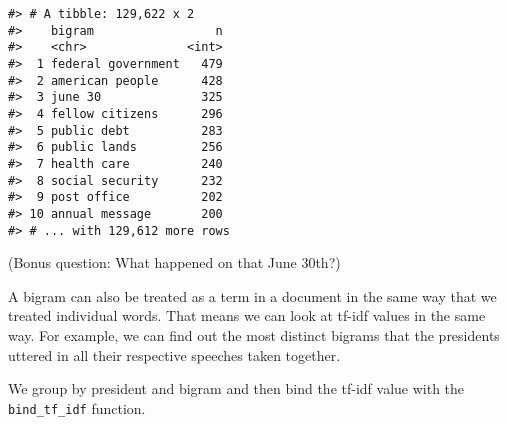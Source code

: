 \documentclass[]{book}
\newenvironment{Shaded}{\begin{snugshade}}{\end{snugshade}}
\newcommand{\CommentTok}[1]{\textcolor[rgb]{0.56,0.35,0.01}{\textit{#1}}}
\newcommand{\DataTypeTok}[1]{\textcolor[rgb]{0.13,0.29,0.53}{#1}}
\newcommand{\DecValTok}[1]{\textcolor[rgb]{0.00,0.00,0.81}{#1}}
\newcommand{\KeywordTok}[1]{\textcolor[rgb]{0.13,0.29,0.53}{\textbf{#1}}}
\newcommand{\NormalTok}[1]{#1}
\newcommand{\OperatorTok}[1]{\textcolor[rgb]{0.81,0.36,0.00}{\textbf{#1}}}
\newcommand{\OtherTok}[1]{\textcolor[rgb]{0.56,0.35,0.01}{#1}}
\newcommand{\StringTok}[1]{\textcolor[rgb]{0.31,0.60,0.02}{#1}}
\begin{document}
\begin{Shaded}
\end{Shaded}

\begin{verbatim}
#> # A tibble: 129,622 x 2
#>    bigram                 n
#>    <chr>              <int>
#>  1 federal government   479
#>  2 american people      428
#>  3 june 30              325
#>  4 fellow citizens      296
#>  5 public debt          283
#>  6 public lands         256
#>  7 health care          240
#>  8 social security      232
#>  9 post office          202
#> 10 annual message       200
#> # ... with 129,612 more rows
\end{verbatim}

(Bonus question: What happened on that June 30th?)

A bigram can also be treated as a term in a document in the same way that we treated individual words. That means we can look at tf-idf values in the same way. For example, we can find out the most distinct bigrams that the presidents uttered in all their respective speeches taken together.

We group by president and bigram and then bind the tf-idf value with the \texttt{bind\_tf\_idf} function.
\end{document}
